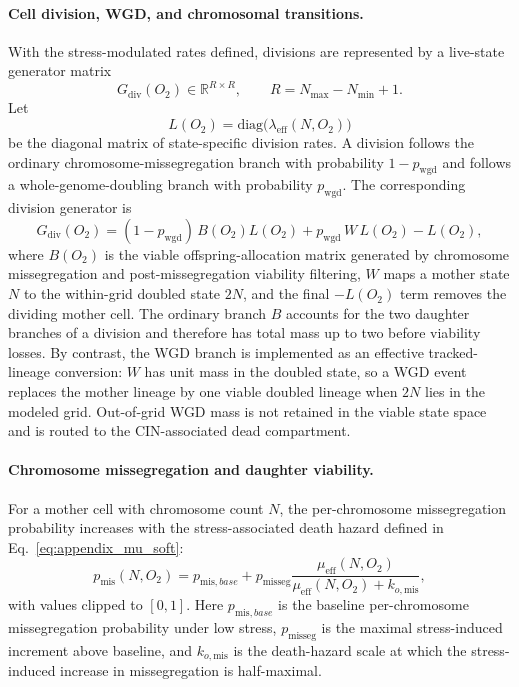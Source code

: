 \documentclass[11pt]{article}
\begin{document}
\paragraph{Cell division, WGD, and chromosomal transitions.}

With the stress-modulated rates defined, divisions are represented by a live-state generator matrix
\begin{equation}
G_{\mathrm{div}}(O_2) \in \mathbb{R}^{R\times R},
\qquad
R=N_{\max}-N_{\min}+1.
\label{eq:appendix_gdiv_dimension}
\end{equation}
Let
\begin{equation}
L(O_2)=\mathrm{diag}\!\bigl(\lambda_{\mathrm{eff}}(N,O_2)\bigr)
\label{eq:appendix_division_rate_matrix}
\end{equation}
be the diagonal matrix of state-specific division rates. A division follows the ordinary chromosome-missegregation branch with probability $1-p_{\mathrm{wgd}}$ and follows a whole-genome-doubling branch with probability $p_{\mathrm{wgd}}$. The corresponding division generator is
\begin{equation}
G_{\mathrm{div}}(O_2)=
(1-p_{\mathrm{wgd}})\,B(O_2)L(O_2)
+
p_{\mathrm{wgd}}\,W\,L(O_2)
-L(O_2),
\label{eq:appendix_gdiv}
\end{equation}
where $B(O_2)$ is the viable offspring-allocation matrix generated by chromosome missegregation and post-missegregation viability filtering, $W$ maps a mother state $N$ to the within-grid doubled state $2N$, and the final $-L(O_2)$ term removes the dividing mother cell. The ordinary branch $B$ accounts for the two daughter branches of a division and therefore has total mass up to two before viability losses. By contrast, the WGD branch is implemented as an effective tracked-lineage conversion: $W$ has unit mass in the doubled state, so a WGD event replaces the mother lineage by one viable doubled lineage when $2N$ lies in the modeled grid. Out-of-grid WGD mass is not retained in the viable state space and is routed to the CIN-associated dead compartment.

\paragraph{Chromosome missegregation and daughter viability.}

For a mother cell with chromosome count $N$, the per-chromosome missegregation probability increases with the stress-associated death hazard defined in Eq.~\eqref{eq:appendix_mu_soft}:
\begin{equation}
p_{\mathrm{mis}}(N,O_2)
= p_{\mathrm{mis},base} +
p_{\mathrm{misseg}}
\frac{\mu_{\mathrm{eff}}(N,O_2)}
{\mu_{\mathrm{eff}}(N,O_2)+k_{o,\mathrm{mis}}},
\label{eq:appendix_pmis_hypoxia}
\end{equation}
with values clipped to $[0,1]$. Here $p_{\mathrm{mis},base}$ is the baseline per-chromosome missegregation probability under low stress, $p_{\mathrm{misseg}}$ is the maximal stress-induced increment above baseline, and $k_{o,\mathrm{mis}}$ is the death-hazard scale at which the stress-induced increase in missegregation is half-maximal.
\end{document}
